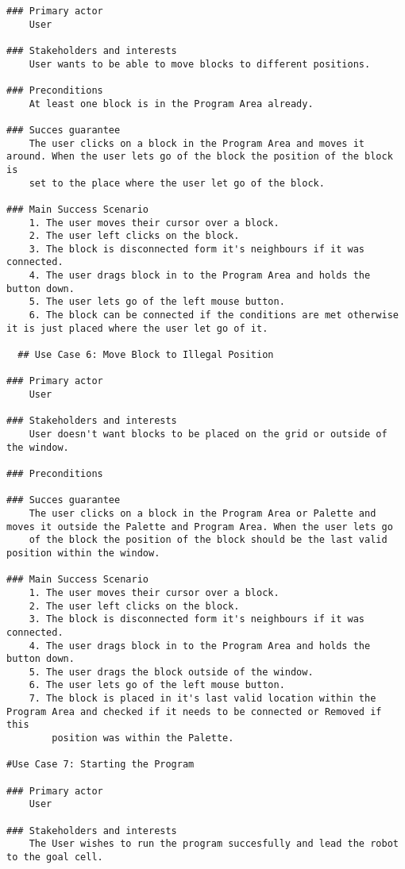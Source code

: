 \documentclass{article}
\begin{document}
\begin{verbatim}
### Primary actor
    User
    
### Stakeholders and interests
    User wants to be able to move blocks to different positions.

### Preconditions
    At least one block is in the Program Area already.

### Succes guarantee
    The user clicks on a block in the Program Area and moves it around. When the user lets go of the block the position of the block is
    set to the place where the user let go of the block.

### Main Success Scenario
    1. The user moves their cursor over a block. 
    2. The user left clicks on the block. 
    3. The block is disconnected form it's neighbours if it was connected.
    4. The user drags block in to the Program Area and holds the button down. 
    5. The user lets go of the left mouse button. 
    6. The block can be connected if the conditions are met otherwise it is just placed where the user let go of it.

  ## Use Case 6: Move Block to Illegal Position

### Primary actor
    User
    
### Stakeholders and interests
    User doesn't want blocks to be placed on the grid or outside of the window.

### Preconditions

### Succes guarantee
    The user clicks on a block in the Program Area or Palette and moves it outside the Palette and Program Area. When the user lets go
    of the block the position of the block should be the last valid position within the window.

### Main Success Scenario
    1. The user moves their cursor over a block. 
    2. The user left clicks on the block. 
    3. The block is disconnected form it's neighbours if it was connected.
    4. The user drags block in to the Program Area and holds the button down. 
    5. The user drags the block outside of the window.
    6. The user lets go of the left mouse button. 
    7. The block is placed in it's last valid location within the Program Area and checked if it needs to be connected or Removed if this
        position was within the Palette.

#Use Case 7: Starting the Program

### Primary actor
    User
    
### Stakeholders and interests
    The User wishes to run the program succesfully and lead the robot to the goal cell.


\end{verbatim}
\end{document}
